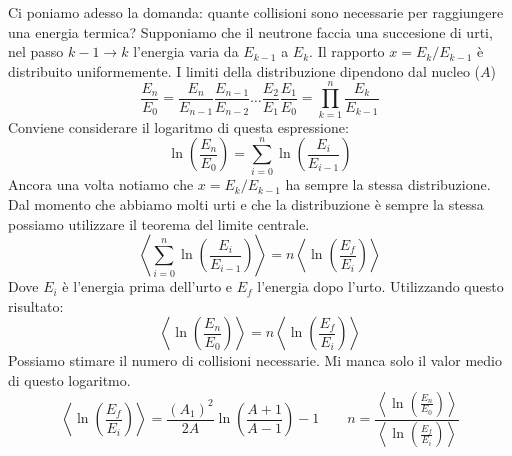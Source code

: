 Ci poniamo adesso la domanda: quante collisioni sono necessarie per raggiungere una energia termica? Supponiamo che il neutrone faccia una succesione di urti,  nel passo $k-1\to k$ l'energia varia da $E_{k-1}$ a $E_k$. Il rapporto $x=E_k/E_{k-1}$ è distribuito uniformemente. I limiti della distribuzione dipendono dal nucleo ($A$)
\begin{equation*}
    \frac{E_n}{E_0}=\frac{E_n}{E_{n-1}}\frac{E_{n-1}}{E_{n-2}}\ldots\frac{E_2}{E_1}\frac{E_1}{E_0}=	\prod_{k=1}^n \frac{E_k}{E_{k-1}}
\end{equation*}
Conviene considerare il logaritmo di questa espressione:
\begin{equation*}
    \ln\left(\frac{E_n}{E_0}\right)=\sum_{i=0}^n\ln\left(\frac{E_i}{E_{i-1}}\right)
\end{equation*}
Ancora una volta notiamo che $x=E_k/E_{k-1}$ ha sempre la stessa distribuzione. Dal momento che abbiamo molti urti e che la distribuzione è sempre la stessa possiamo utilizzare il teorema del limite centrale.
\begin{equation*}
    \left \langle \sum_{i=0}^n\ln\left(\frac{E_i}{E_{i-1}}\right) \right \rangle=n\left \langle \ln\left(\frac{E_f}{E_i}\right) \right \rangle
\end{equation*}
Dove $E_i$ è l'energia prima dell'urto e $E_f$ l'energia dopo l'urto. Utilizzando questo risultato:
\begin{equation*}
    \left \langle \ln\left(\frac{E_n}{E_0}\right) \right \rangle =n\left \langle \ln\left(\frac{E_f}{E_i}\right)\right \rangle 
\end{equation*}
Possiamo stimare il numero di collisioni necessarie. Mi manca solo il valor medio di questo logaritmo.
\begin{equation*}
    \left \langle \ln\left(\frac{E_f}{E_i}\right)\right \rangle=\frac{(A_1)^2}{2A}\ln{\left(\frac{A+1}{A-1}\right)}-1 \qquad n=\frac{\left \langle \ln\left(\frac{E_n}{E_0}\right) \right \rangle}{\left \langle \ln\left(\frac{E_f}{E_i}\right)\right \rangle}
\end{equation*}
